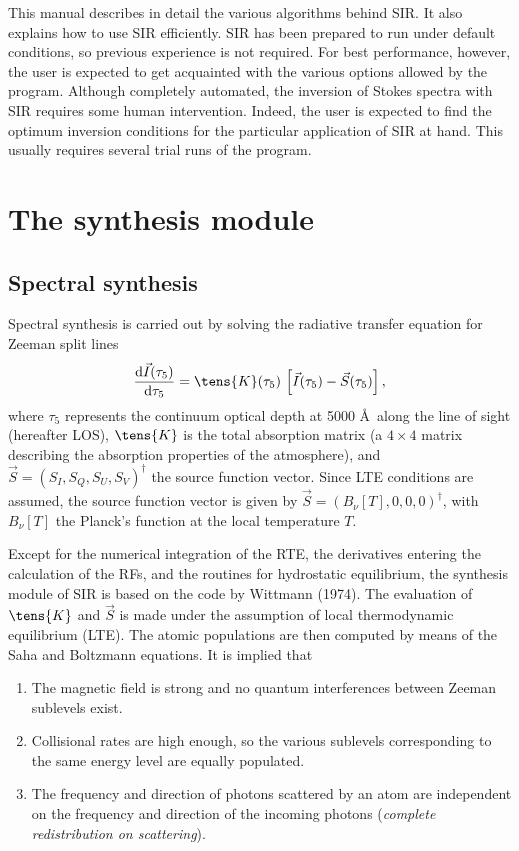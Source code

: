 This manual describes in detail the various algorithms behind SIR. It
also explains how to use SIR efficiently. SIR has been prepared to run
under default conditions, so previous experience is not required. For
best performance, however, the user is expected to get acquainted with
the various options allowed by the program. Although completely
automated, the inversion of Stokes spectra with SIR requires some human
intervention. Indeed, the user is expected to find the optimum
inversion conditions for the particular application of SIR at hand. This
usually requires several trial runs of the program. 


\section{The synthesis module}
\subsection{Spectral synthesis}
Spectral synthesis is carried out by solving the radiative transfer
equation for Zeeman split lines  
\begin{displaymath}
\frac{{\rm d}\vec{I}(\tau_5)}{{\rm d}\tau_5} =  \tens{K}(\tau_5) \, \left[  \vec{I}(\tau_5) 
- \vec{S}(\tau_5) \right], 
\end{displaymath}
where $\tau_5$ represents the continuum optical depth at 5000 \AA\
along the line of sight (hereafter LOS), $\tens{K}$ is the total
absorption matrix (a $4\times4$ matrix describing the absorption
properties of the atmosphere), and $\vec{S} = (S_{\scriptscriptstyle
I},S_{\scriptscriptstyle Q}, S_{\scriptscriptstyle
U},S_{\scriptscriptstyle V})^{\dag}$ the source function vector. Since
LTE conditions are assumed, the source function vector is given by
$\vec{S} = (B_\nu[T],0,0,0)^{\dag}$, with $B_\nu[T]$ the Planck's function
at the local temperature $T$. 

Except for the numerical integration of the RTE, the derivatives entering
the calculation of the RFs, and the routines for hydrostatic equilibrium, the
synthesis module of SIR is based on the code by Wittmann (1974). The
evaluation of $\tens{K}$ and $\vec{S}$ is made under the assumption of
local thermodynamic equilibrium (LTE). The atomic populations are then
computed by means of the Saha and Boltzmann equations. It is implied that
\begin{enumerate}
\item The magnetic field is strong and no quantum interferences between
Zeeman sublevels exist.

\item Collisional rates are high enough, so the various sublevels
corresponding to the same energy level are equally populated. 

\item The frequency and direction of photons scattered by an atom are
independent on the frequency and direction of the incoming photons
({\em complete redistribution on scattering}).
\end{enumerate}

